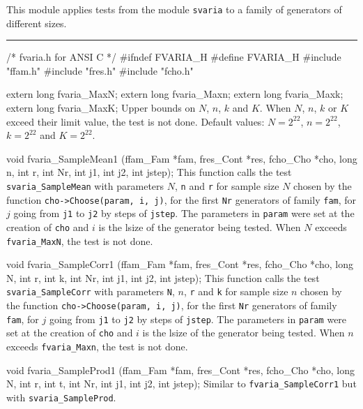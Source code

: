 
This module applies tests from the module {\tt svaria}
to a family of generators of different sizes.

\bigskip
\hrule
\code\hide
/* fvaria.h  for ANSI C */
#ifndef FVARIA_H
#define FVARIA_H
\endhide
#include "ffam.h"
#include "fres.h"
#include "fcho.h"


extern long fvaria_MaxN;
extern long fvaria_Maxn;
extern long fvaria_Maxk;
extern long fvaria_MaxK;
\endcode
\tab
  Upper bounds on $N$, $n$, $k$ and $K$.
  When $N$, $n$, $k$ or $K$ exceed their limit value, the test is not done.
  Default values: $N = 2^{22}$, $n = 2^{22}$, $k = 2^{22}$ and $K = 2^{22}$.
\endtab


\code

void fvaria_SampleMean1 (ffam_Fam *fam, fres_Cont *res, fcho_Cho *cho,
                         long n, int r,
                         int Nr, int j1, int j2, int jstep);
\endcode
\tab  This function calls the test {\tt svaria\_SampleMean} with parameters
  $N$,  {\tt n} and  {\tt r} for sample size $N$ chosen by the function
 {\tt cho->Choose(param, i, j)},
 for the first {\tt Nr} generators of family {\tt fam}, for $j$ going from
 {\tt j1} to {\tt j2} by steps of {\tt jstep}. The parameters in {\tt param}
 were set at the creation of {\tt cho} and $i$ is the lsize of the
 generator being tested.
 When $N$ exceeds {\tt fvaria\_MaxN}, the test is not done.
\endtab
\code


void fvaria_SampleCorr1 (ffam_Fam *fam, fres_Cont *res, fcho_Cho *cho,
                         long N, int r, int k,
                         int Nr, int j1, int j2, int jstep);
\endcode
\tab  This function calls the test {\tt svaria\_SampleCorr} with parameters
 {\tt N}, $n$, {\tt r} and {\tt k} for sample size $n$ chosen by the function
 {\tt cho->Choose(param, i, j)},
 for the first {\tt Nr} generators of family {\tt fam}, for $j$ going from
 {\tt j1} to {\tt j2} by steps of {\tt jstep}. The parameters in {\tt param}
 were set at the creation of {\tt cho} and $i$ is the lsize of the
 generator being tested.
 When $n$ exceeds {\tt fvaria\_Maxn}, the test is not done.
\endtab
\code


void fvaria_SampleProd1 (ffam_Fam *fam, fres_Cont *res, fcho_Cho *cho,
                         long N, int r, int t,
                         int Nr, int j1, int j2, int jstep);
\endcode
\tab Similar to {\tt fvaria\_SampleCorr1} but with {\tt svaria\_SampleProd}.
\endtab
\code


